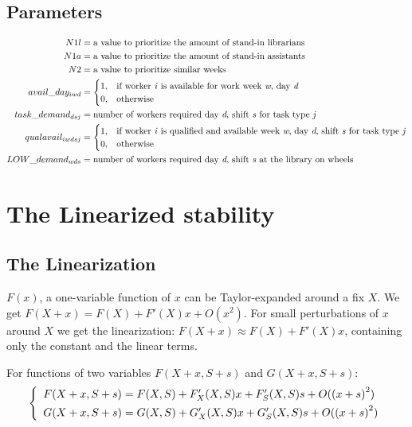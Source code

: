 \documentclass[a4paper, 10pt, twoside, openright]{book}
\begin{document}
\section{Parameters} \label{params}
\begin{align}
	N1l&= \text{a value to prioritize the amount of stand-in librarians}
	\\
	N1a&= \text{a value to prioritize the amount of stand-in assistants}
	\\
	N2&= \text{a value to prioritize similar weeks}
	\\
	avail\_day_{iwd}&=
	\begin{cases}
		1, & \text{if worker \textit{i} is available for work week \textit{w}, day \textit{d}} \\
		0, & \text{otherwise}
	\end{cases}
	\\
	task\_demand_{dsj}&= \text{number of workers required day \textit{d}, shift \textit{s} for task type \textit{j}}
	\\
	qualavail_{iwdsj}&=
	\begin{cases}
		1, & \text{if worker \textit{i} is qualified and available week \textit{w}, day \textit{d}, shift \textit{s} for task type \textit{j}} \\
		0, & \text{otherwise}
	\end{cases}
	\\
	LOW\_demand_{wds}&= \text{number of workers required day \textit{d}, shift \textit{s} at the library on wheels}
\end{align}


\chapter{The Linearized stability} \label{Stab}

\section{The Linearization}

$F(x)$, a one-variable function of $x$ can be Taylor-expanded
around a fix $X$. We get $F(X+x)=F(X) + F'(X) x + O({x}^{2})$.
For small perturbations of $x$ around $X$ we get the linearization:
$F(X+x) \approx F(X) + F'(X) x$, containing only the
constant and the linear terms.

For functions of two variables $F(X+x,S+s)$ and $G(X+x,S+s)$:
\begin{displaymath} 
\left\{ \begin{array}{l}
F(X+x,S+s)= F(X,S) + {F}_{X}'(X,S)x + {F}_{S}'(X,S)s + O({(x+s)}^{2})\\
G(X+x,S+s)= G(X,S) + {G}_{X}'(X,S)x + {G}_{S}'(X,S)s + O({(x+s)}^{2})
\rule{0pt}{3ex} 
\end{array}\right. 
\end{displaymath}
\end{document}
